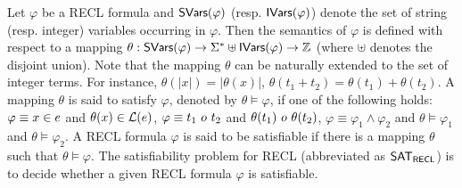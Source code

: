 Let $\varphi$ be a RECL formula and ${\sf SVars}(\varphi)$ (resp. ${\sf IVars}(\varphi)$) denote the set of string (resp. integer) variables occurring in $\varphi$. 
%
Then the semantics of  $\varphi$ is defined with respect to a mapping $\theta: {\sf SVars}(\varphi) \rightarrow \Sigma^* \uplus {\sf IVars}(\varphi) \rightarrow \mathbb{Z}$ (where $\uplus$ denotes the disjoint union). 
Note that the mapping $\theta$ can be naturally extended to the set of integer terms. For instance, $\theta(|x|) =|\theta(x)|$, $\theta(t_1 + t_2) = \theta(t_1) + \theta(t_2)$. 
A  mapping $\theta$ is said to satisfy $\varphi$, denoted by $\theta \models \varphi$, if one of the following holds: 
$\varphi \equiv x \in e$ and $\theta(x) \in \mathcal{L}(e)$, 
%
%
$\varphi \equiv t_1\ \op\ t_2$ and $\theta(t_1)\ \op\ \theta(t_2)$, 
%
$\varphi \equiv \varphi_1 \wedge \varphi_2$ and $\theta \models \varphi_1$ and $\theta \models \varphi_2$.
A RECL formula $\varphi$ is said to be satisfiable if there is a mapping $\theta$ such that $\theta \models \varphi$. The satisfiability problem for RECL (abbreviated as ${\sf SAT_{RECL}}$) is to decide whether a given RECL formula $\varphi$ is satisfiable. 


